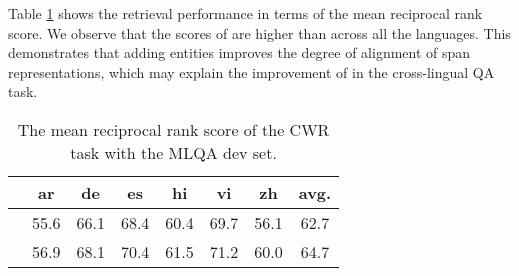 \documentclass[11pt]{article}
\newcommand{\minisection}[1]{\noindent{\bf {#1}.}}
\begin{document}
\minisection{Results}
Table \ref{table:squad_retrieval} shows the retrieval performance in terms of the mean reciprocal rank score.
We observe that the scores of \mlukeE{}\ba{} are higher than \mlukeW{}\ba{} across all the languages.
This demonstrates that adding entities improves the degree of alignment of span representations, which may explain the improvement of \mlukeE{} in the cross-lingual QA task.

\begin{table}[ht]
  \small
  \setlength\tabcolsep{3pt}
  \centering
  \begin{tabular}{lccccccc} \toprule
        &     ar      &     de     &     es     &     hi     &     vi     &     zh     &    avg.    \\ \midrule
\mlukeW{}\ba{}  &    55.6    &    66.1    &    68.4    &    60.4    &    69.7    &    56.1    &    62.7    \\
\mlukeE{}\ba{}  &    56.9    &    68.1    &    70.4    &    61.5    &    71.2    &    60.0    &    64.7    \\ \bottomrule
  \end{tabular}
  \caption{The mean reciprocal rank score of the CWR task with the MLQA dev set.}
  \label{table:squad_retrieval}
\end{table}
\end{document}

